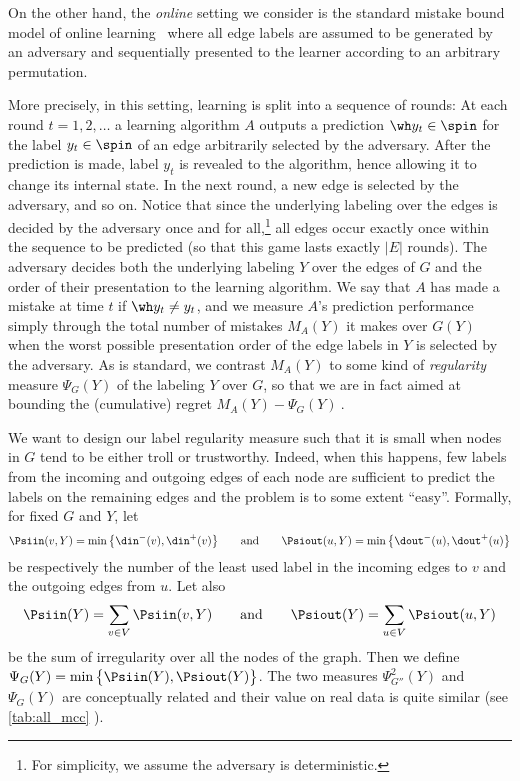 On the other hand, the \emph{online} setting we consider is the standard mistake bound model of
online learning~\autocite{Winnow88} where all edge labels are assumed to be generated by an
adversary and sequentially presented to the learner according to an arbitrary permutation.
\iffalse
For an
online learning algorithm $A$, we are interested in measuring the total number of mistakes $M_A(Y)$
the algorithm makes over $G(Y)$ when the worst possible presentation order of the edge labels in
$Y$ is selected by the adversary.
\fi
More precisely,
  in this setting, learning is split into a sequence of rounds: At each round $t=1,2,\ldots$ a
  learning algorithm $A$ outputs a prediction ${\wh y_t} \in \spin$ for the label $y_t \in \spin$
  of an edge arbitrarily selected by the adversary. After the prediction is made, label $y_t$ is
  revealed to the algorithm, hence allowing it to change its internal state. In the next round, a
  new edge is selected by the adversary, and so on. Notice that since the underlying labeling over
  the edges is decided by the adversary once and for all,\footnote{For simplicity, we assume the
  adversary is deterministic.} all edges occur exactly once within the sequence to be predicted (so
  that this game lasts exactly $|E|$ rounds). The adversary decides both the underlying labeling
  $Y$ over the edges of $G$ and the order of their presentation to the learning algorithm. We say
  that $A$ has made a mistake at time $t$ if ${\wh y_t} \neq y_t$, and we measure $A$'s prediction
  performance simply through the total number of mistakes $M_A(Y)$ it makes over $G(Y)$ when the
  worst possible presentation order of the edge labels in $Y$ is selected by the adversary. As is
  standard, we contrast $M_A(Y)$ to some kind of \emph{regularity} measure $\Psi_G(Y)$ of the
  labeling $Y$ over $G$, so that we are in fact aimed at bounding the (cumulative) regret \( M_A(Y)
  - \Psi_G(Y)~.\)

We want to design our label regularity measure such that it is small when
nodes in $G$ tend to be either troll or trustworthy. Indeed, when this happens, few labels from the
incoming and outgoing edges of each node are sufficient to predict the labels on the remaining
edges and the \esp{} problem is to some extent \enquote{easy}. Formally, for fixed $G$ and $Y$, let 
$$
\Psiin(v,Y) = \min\big\{\din^-(v),\din^+(v)\big\}
\qquad\text{and}\qquad
\Psiout(u,Y) = \min\big\{\dout^-(u),\dout^+(u)\big\}
$$
be respectively the number of the least used label in the incoming edges to $v$ and the outgoing
edges from $u$.
Let also
$$
\Psiin(Y) = \sum_{v \in V} \Psiin(v,Y)
\qquad\text{and}\qquad
\Psiout(Y) = \sum_{u \in V} \Psiout(u,Y)
$$
be the sum of irregularity over all the nodes of the graph.
Then we define $\Psi_G(Y) = \min\big\{\Psiin(Y),\Psiout(Y)\big\}$. The two measures
$\Psi^2_{G''}(Y)$ and $\Psi_G(Y)$ are conceptually related and their value on real data is quite
similar (see \autoref{tab:all_mcc} ).

